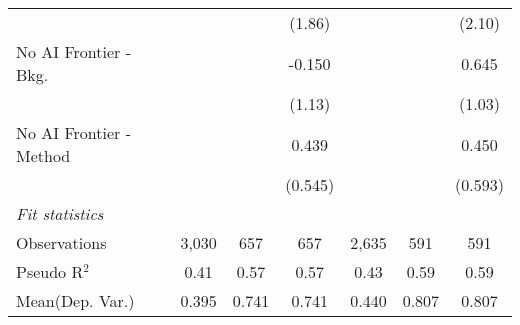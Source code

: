 \begin{tabular}{lcccccc}
                           &               &         & (1.86)        &              &         & (2.10)\\   
   No AI Frontier - Bkg.   &               &         & -0.150        &              &         & 0.645\\   
                           &               &         & (1.13)        &              &         & (1.03)\\   
   No AI Frontier - Method &               &         & 0.439         &              &         & 0.450\\   
                           &               &         & (0.545)       &              &         & (0.593)\\   
   \midrule
   \emph{Fit statistics}\\
   Observations            & 3,030         & 657     & 657           & 2,635        & 591     & 591\\  
   Pseudo R$^2$            & 0.41          & 0.57    & 0.57          & 0.43         & 0.59    & 0.59\\  
Mean(Dep. Var.) & 0.395 & 0.741 & 0.741 & 0.440 & 0.807 & 0.807 \\
   

\end{tabular}
